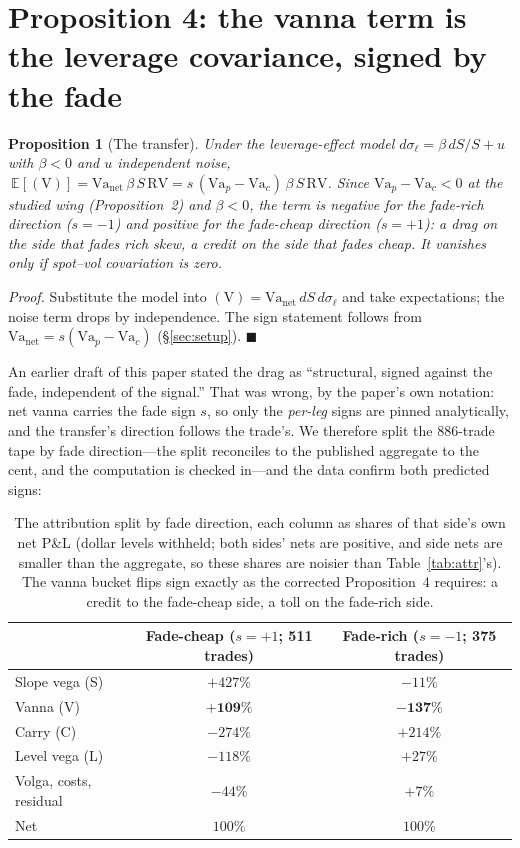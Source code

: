\documentclass[11pt]{article}
\newcommand{\Va}{\mathrm{Va}}
\newtheorem{prop}{Proposition}
\begin{document}
\section{Proposition 4: the vanna term is the leverage covariance, signed by the fade}
\begin{prop}[The transfer]
Under the leverage-effect model $d\sigma_\ell = \beta\, dS/S + u$ with $\beta < 0$ and $u$
independent noise,
$\ \mathbb E[(\mathrm V)] = \Va_{\mathrm{net}}\, \beta\, S\, \mathrm{RV}
 = s\,(\Va_p - \Va_c)\, \beta\, S\, \mathrm{RV}$.
Since $\Va_p - \Va_c < 0$ at the studied wing (Proposition~2) and $\beta < 0$, the term is
negative for the fade-rich direction ($s = -1$) and positive for the fade-cheap direction
($s = +1$): a drag on the side that fades rich skew, a credit on the side that fades cheap. It
vanishes only if spot--vol covariation is zero.
\end{prop}
\emph{Proof.} Substitute the model into $(\mathrm V) = \Va_{\mathrm{net}}\, dS\, d\sigma_\ell$
and take expectations; the noise term drops by independence. The sign statement follows from
$\Va_{\mathrm{net}} = s(\Va_p - \Va_c)$ (\S\ref{sec:setup}). $\blacksquare$

An earlier draft of this paper stated the drag as ``structural, signed against the fade,
independent of the signal.'' That was wrong, by the paper's own notation: net vanna carries the
fade sign $s$, so only the \emph{per-leg} signs are pinned analytically, and the transfer's
direction follows the trade's. We therefore split the 886-trade tape by fade direction---the
split reconciles to the published aggregate to the cent, and the computation is checked
in---and the data confirm both predicted signs:

\begin{table}[h]\centering\small
\begin{tabular}{lcc}\toprule
& Fade-cheap ($s{=}+1$; 511 trades) & Fade-rich ($s{=}-1$; 375 trades) \\ \midrule
Slope vega (S) & $+427\%$ & $-11\%$ \\
Vanna (V) & $\mathbf{+109\%}$ & $\mathbf{-137\%}$ \\
Carry (C) & $-274\%$ & $+214\%$ \\
Level vega (L) & $-118\%$ & $+27\%$ \\
Volga, costs, residual & $-44\%$ & $+7\%$ \\
Net & $100\%$ & $100\%$ \\ \bottomrule
\end{tabular}
\caption{The attribution split by fade direction, each column as shares of that side's own net
P\&L (dollar levels withheld; both sides' nets are positive, and side nets are smaller than the
aggregate, so these shares are noisier than Table~\ref{tab:attr}'s). The vanna bucket flips
sign exactly as the corrected Proposition~4 requires: a credit to the fade-cheap side, a toll
on the fade-rich side.}
\label{tab:split}\end{table}
\end{document}
